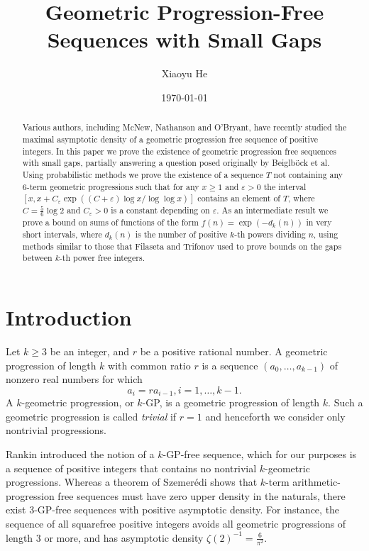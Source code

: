 \documentclass[12pt,english,BCOR7.5mm]{amsart}
\numberwithin{equation}{section}
\numberwithin{figure}{section}
\theoremstyle{definition}
\theoremstyle{plain}
\theoremstyle{plain}
\theoremstyle{plain}
\theoremstyle{definition}
\theoremstyle{plain}
\theoremstyle{plain}
\begin{document}
\title{Geometric Progression-Free Sequences with Small Gaps}

\author{Xiaoyu He}


\address{Eliot House, Harvard College, Cambridge, MA 02138.}

\date{\today}
\begin{abstract}
Various authors, including McNew, Nathanson and O'Bryant, have recently
studied the maximal asymptotic density of a geometric progression
free sequence of positive integers. In this paper we prove the existence
of geometric progression free sequences with small gaps, partially
answering a question posed originally by Beiglböck et al. Using probabilistic
methods we prove the existence of a sequence $T$ not containing any
$6$-term geometric progressions such that for any $x\geq1$ and $\varepsilon>0$
the interval $[x,x+C_{\varepsilon}\exp((C+\varepsilon)\log x/\log\log x)]$
contains an element of $T$, where $C=\frac{5}{6}\log2$ and $C_{\varepsilon}>0$
is a constant depending on $\varepsilon$. As an intermediate result
we prove a bound on sums of functions of the form $f(n)=\exp(-d_{k}(n))$
in very short intervals, where $d_{k}(n)$ is the number of positive
$k$-th powers dividing $n$, using methods similar to those that
Filaseta and Trifonov used to prove bounds on the gaps between $k$-th
power free integers.
\end{abstract}
\maketitle

\section*{Introduction}

Let $k\ge3$ be an integer, and $r$ be a positive rational number.
A geometric progression of length $k$ with common ratio $r$ is a
sequence $(a_{0},\ldots,a_{k-1})$ of nonzero real numbers for which
\[
a_{i}=ra_{i-1},i=1,\ldots,k-1.
\]
A $k$-geometric progression, or $k$-GP, is a geometric progression
of length $k$. Such a geometric progression is called \emph{trivial}
if $r=1$ and henceforth we consider only nontrivial progressions.

Rankin \cite{Rankin} introduced the notion of a $k$-GP-free sequence,
which for our purposes is a sequence of positive integers that contains
no nontrivial $k$-geometric progressions. Whereas a theorem of Szemerédi
\cite{Szemeredi} shows that $k$-term arithmetic-progression free
sequences must have zero upper density in the naturals, there exist
$3$-GP-free sequences with positive asymptotic density. For instance,
the sequence of all squarefree positive integers avoids all geometric
progressions of length $3$ or more, and has asymptotic density $\zeta(2)^{-1}=\frac{6}{\pi^{2}}$.
\end{document}
